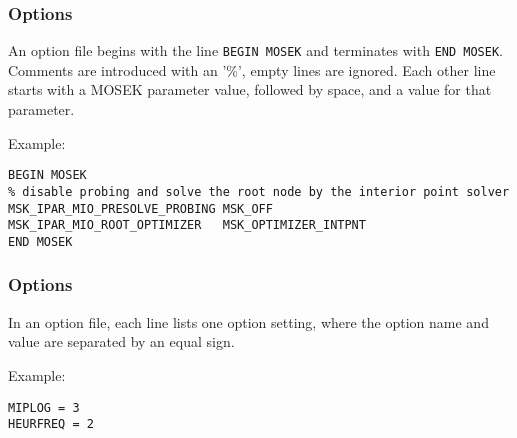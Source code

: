 \subsubsection{\OSIMOSEK Options}
An \OSIMOSEK option file begins with the line \texttt{BEGIN MOSEK} and terminates with \texttt{END MOSEK}.
Comments are introduced with an '\%', empty lines are ignored.
Each other line starts with a MOSEK parameter value, followed by space, and a value for that parameter.

Example:
\begin{verbatim}
BEGIN MOSEK
% disable probing and solve the root node by the interior point solver
MSK_IPAR_MIO_PRESOLVE_PROBING MSK_OFF
MSK_IPAR_MIO_ROOT_OPTIMIZER   MSK_OPTIMIZER_INTPNT
END MOSEK
\end{verbatim}

\subsubsection{\OSIXPRESS Options}
In an \OSIXPRESS option file, each line lists one option setting, where the option name and value are separated by an equal sign.

Example:
\begin{verbatim}
MIPLOG = 3
HEURFREQ = 2
\end{verbatim}





\chapterend
